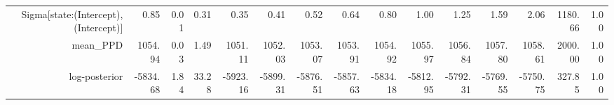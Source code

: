\begin{table}[ht]
\begin{tabular}{rrrrrrrrrrrrrrr}
  Sigma[state:(Intercept),(Intercept)] & 0.85 & 0.01 & 0.31 & 0.35 & 0.41 & 0.52 & 0.64 & 0.80 & 1.00 & 1.25 & 1.59 & 2.06 & 1180.66 & 1.00 \\ 
  mean\_PPD & 1054.94 & 0.03 & 1.49 & 1051.11 & 1052.03 & 1053.07 & 1053.91 & 1054.92 & 1055.97 & 1056.84 & 1057.80 & 1058.61 & 2000.00 & 1.00 \\ 
  log-posterior & -5834.68 & 1.84 & 33.28 & -5923.16 & -5899.31 & -5876.51 & -5857.63 & -5834.18 & -5812.95 & -5792.31 & -5769.55 & -5750.75 & 327.85 & 1.00 \\ 
   \hline
\end{tabular}
\end{table}
